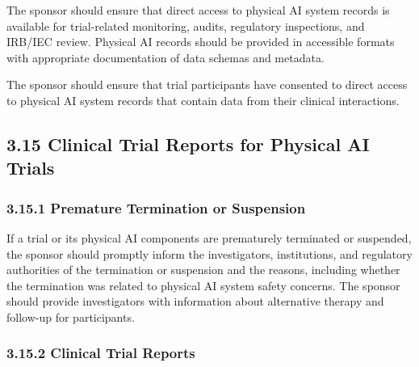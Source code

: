 \begin{description}[leftmargin=2.5cm,style=sameline]

\item[(a)] The sponsor should ensure that direct access to physical AI system records is available for trial-related monitoring, audits, regulatory inspections, and IRB/IEC review. Physical AI records should be provided in accessible formats with appropriate documentation of data schemas and metadata.

\item[(b)] The sponsor should ensure that trial participants have consented to direct access to physical AI system records that contain data from their clinical interactions.

\end{description}

\subsection{3.15 Clinical Trial Reports for Physical AI Trials}

\subsubsection{3.15.1 Premature Termination or Suspension}

If a trial or its physical AI components are prematurely terminated or suspended, the sponsor should promptly inform the investigators, institutions, and regulatory authorities of the termination or suspension and the reasons, including whether the termination was related to physical AI system safety concerns. The sponsor should provide investigators with information about alternative therapy and follow-up for participants.

\subsubsection{3.15.2 Clinical Trial Reports}


